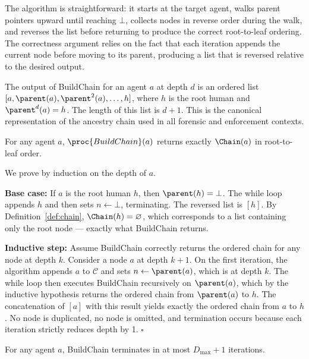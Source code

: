 The algorithm is straightforward: it starts at the target agent, walks parent pointers upward until reaching $\bot$, collects nodes in reverse order during the walk, and reverses the list before returning to produce the correct root-to-leaf ordering. The correctness argument relies on the fact that each iteration appends the current node before moving to its parent, producing a list that is reversed relative to the desired output.

The output of BuildChain for an agent $a$ at depth $d$ is an ordered list $[a, \parent(a), \parent^2(a), \ldots, h]$, where $h$ is the root human and $\parent^d(a) = h$. The length of this list is $d + 1$. This is the canonical representation of the ancestry chain used in all forensic and enforcement contexts.

\begin{Proposition}
\label{prop:build-chain-correct}
For any agent $a$, $\proc{BuildChain}(a)$ returns exactly $\Chain(a)$ in root-to-leaf order.
\end{Proposition}

\begin{Proof}
We prove by induction on the depth of $a$.

\textbf{Base case:} If $a$ is the root human $h$, then $\parent(h) = \bot$. The while loop appends $h$ and then sets $n \gets \bot$, terminating. The reversed list is $[h]$. By Definition~\ref{def:chain}, $\Chain(h) = \varnothing$, which corresponds to a list containing only the root node — exactly what BuildChain returns.

\textbf{Inductive step:} Assume BuildChain correctly returns the ordered chain for any node at depth $k$. Consider a node $a$ at depth $k+1$. On the first iteration, the algorithm appends $a$ to $\mathcal{C}$ and sets $n \gets \parent(a)$, which is at depth $k$. The while loop then executes BuildChain recursively on $\parent(a)$, which by the inductive hypothesis returns the ordered chain from $\parent(a)$ to $h$. The concatenation of $[a]$ with this result yields exactly the ordered chain from $a$ to $h$. No node is duplicated, no node is omitted, and termination occurs because each iteration strictly reduces depth by 1. $\square$
\end{Proof}

\begin{Proposition}
\label{prop:chain-finite}
For any agent $a$, BuildChain terminates in at most $D_{\max} + 1$ iterations.
\end{Proposition}

